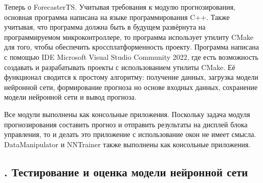 {  \par \redline Теперь о ForecasterTS. Учитывая требования к модулю прогнозирования, основная программа написана на языке программирования C++. Также учитывая, что программа должна быть в будущем развёрнута на программируемом микроконтроллере, то программа использует утилиту CMake для того, чтобы обеспечить кроссплатформенность проекту. Программа написана с помощью IDE Microsoft Visual Studio Community 2022, где есть возможность создавать и разрабатывать проекты с использованием утилиты CMake. Её функционал сводится к простому алгоритму: получение данных, загрузка модели нейронной сети, формирование прогноза но основе входных данных, сохранение модели нейронной сети и вывод прогноза. 

  \par \redline Все модули выполнены как консольные приложения. Поскольку задача модуля прогнозирования составить прогноз и отправить результаты на дисплей блока управления, то и делать это приложение с использование окон не имеет смысла. DataManipulator и NNTrainer также выполнены как консольные приложения. 

}

\subtitlespace

\subsection*{ 
  \gostTitleFont
  \redline
  \thechaptercntr .\thesubchaptercntr \spc 
  Тестирование и оценка модели нейронной сети
} \addtocounter{subchaptercntr}{1} 
  
\subtitlespace
  
